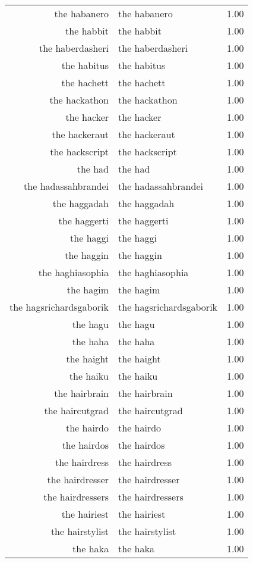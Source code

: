 \begin{table}[ht]
\begin{tabular}{rlr}
  the habanero & the habanero & 1.00 \\ 
  the habbit & the habbit & 1.00 \\ 
  the haberdasheri & the haberdasheri & 1.00 \\ 
  the habitus & the habitus & 1.00 \\ 
  the hachett & the hachett & 1.00 \\ 
  the hackathon & the hackathon & 1.00 \\ 
  the hacker & the hacker & 1.00 \\ 
  the hackeraut & the hackeraut & 1.00 \\ 
  the hackscript & the hackscript & 1.00 \\ 
  the had & the had & 1.00 \\ 
  the hadassahbrandei & the hadassahbrandei & 1.00 \\ 
  the haggadah & the haggadah & 1.00 \\ 
  the haggerti & the haggerti & 1.00 \\ 
  the haggi & the haggi & 1.00 \\ 
  the haggin & the haggin & 1.00 \\ 
  the haghiasophia & the haghiasophia & 1.00 \\ 
  the hagim & the hagim & 1.00 \\ 
  the hagsrichardsgaborik & the hagsrichardsgaborik & 1.00 \\ 
  the hagu & the hagu & 1.00 \\ 
  the haha & the haha & 1.00 \\ 
  the haight & the haight & 1.00 \\ 
  the haiku & the haiku & 1.00 \\ 
  the hairbrain & the hairbrain & 1.00 \\ 
  the haircutgrad & the haircutgrad & 1.00 \\ 
  the hairdo & the hairdo & 1.00 \\ 
  the hairdos & the hairdos & 1.00 \\ 
  the hairdress & the hairdress & 1.00 \\ 
  the hairdresser & the hairdresser & 1.00 \\ 
  the hairdressers & the hairdressers & 1.00 \\ 
  the hairiest & the hairiest & 1.00 \\ 
  the hairstylist & the hairstylist & 1.00 \\ 
  the haka & the haka & 1.00 \\ 

\end{tabular}
\end{table}

